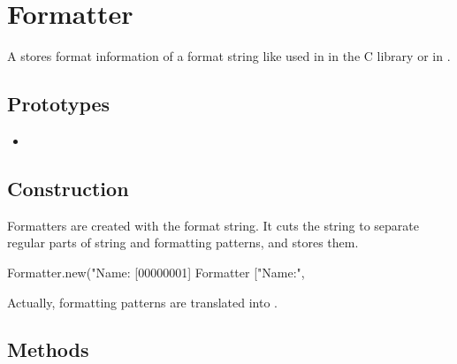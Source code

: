 \section{Formatter}

A  stores format information of a format string like
used in  in the C library or in .

\subsection{Prototypes}

\begin{itemize}
\item {}
\end{itemize}

\subsection{Construction}

Formatters are created with the format string. It cuts the string to
separate regular parts of string and formatting patterns, and stores
them.

\begin{urbiscript}
Formatter.new("Name:%
[00000001] Formatter ["Name:", %
\end{urbiscript}

Actually, formatting patterns are translated into
.

\subsection{Methods}

